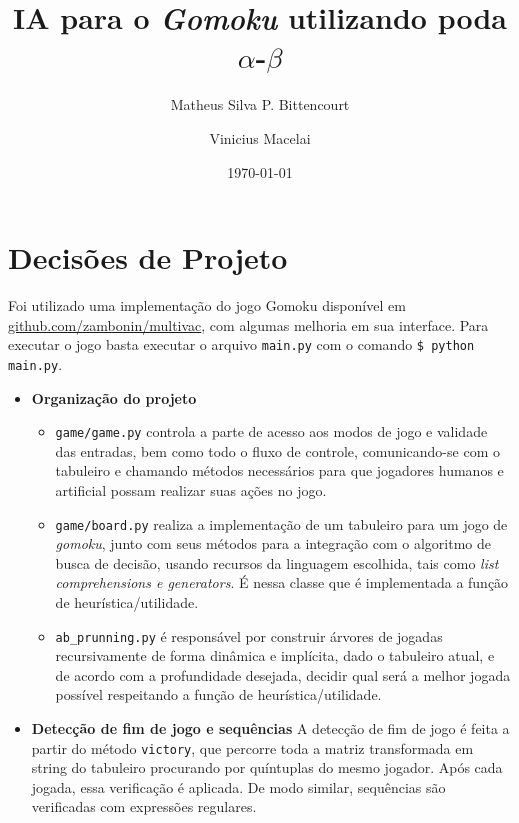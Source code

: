 \documentclass{article}
\title{IA para o \textit{Gomoku} utilizando poda $\alpha$-$\beta$}
\author{Matheus Silva P. Bittencourt \and Vinicius Macelai}
\date{\today}
\begin{document}
\maketitle

\section{Decisões de Projeto}

Foi utilizado uma implementação do jogo Gomoku disponível em
\href{https://github.com/zambonin/multivac/tree/master/gomoku}{github.com/zambonin/multivac},
com algumas melhoria em sua interface. Para executar o jogo basta executar o
arquivo \texttt{main.py} com o comando \texttt{\$ python main.py}.

\begin{itemize}

	\item \textbf{Organização do projeto}
		\begin{itemize}

			\item \texttt{game/game.py} controla a parte de acesso aos modos de
			jogo e validade das entradas, bem como todo o fluxo de controle,
			comunicando-se com o tabuleiro e chamando métodos necessários para
			que jogadores humanos e artificial possam realizar suas ações no
			jogo.

			\item \texttt{game/board.py} realiza a implementação de um
			tabuleiro para um jogo de \textit{gomoku}, junto com seus métodos
			para a integração com o algoritmo de busca de decisão, usando
			recursos da linguagem escolhida, tais como \textit{list
			comprehensions e generators}. É nessa classe que é implementada a
			função de heurística/utilidade.

			\item \texttt{ab\_prunning.py} é responsável por construir árvores
			de jogadas recursivamente de forma dinâmica e implícita, dado o
			tabuleiro atual, e de acordo com a profundidade desejada, decidir
			qual será a melhor jogada possível respeitando a função de
			heurística/utilidade.

		\end{itemize}

	\item \textbf{Detecção de fim de jogo e sequências}
		A detecção de fim de jogo é feita a partir do método \texttt{victory},
		que percorre toda a matriz transformada em string do tabuleiro
		procurando por quíntuplas do mesmo jogador. Após cada jogada, essa
		verificação é aplicada. De modo similar, sequências são verificadas com
		expressões regulares.


\end{itemize}
\end{document}
